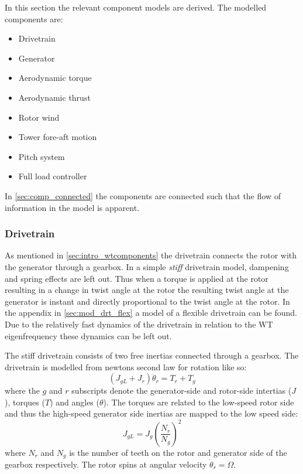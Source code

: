 \smallskip
\noindent In this section the relevant component models are derived. The modelled components are:
\begin{itemize}
	\item Drivetrain
	\item Generator
	\item Aerodynamic torque
	\item Aerodynamic thrust
	\item Rotor wind
	\item Tower fore-aft motion
	\item Pitch system
	\item Full load controller
\end{itemize}
In \cref{sec:comp_connected} the components are connected such that the flow of information in the model is apparent. 


\subsubsection{Drivetrain} \label{sec:comp_drv}
As mentioned in \cref{sec:intro_wtcomponents} the drivetrain connects the rotor with the generator through a gearbox. In a simple \textit{stiff} drivetrain model, dampening and spring effects are left out. Thus when a torque is applied at the rotor resulting in a change in twist angle at the rotor the resulting twist angle at the generator is instant and directly proportional to the twist angle at the rotor. In the appendix in \cref{sec:mod_drt_flex} a model of a flexible drivetrain can be found. Due to the relatively fast dynamics of the drivetrain in relation to the WT eigenfrequency these dynamics can be left out. 

The stiff drivetrain consists of two free inertias connected through a gearbox. The drivetrain is modelled from newtons second law for rotation like so:
\begin{equation}\label{eq:wtlin_comp_drivetrain}
	(J_{gL} + J_{r}) \ddot{\theta}_r = T_{r} + T_{g}
\end{equation}
where the $ g $ and $ r $ subscripts denote the generator-side and rotor-side intertias ($ J $), torques ($ T $) and angles ($ \theta $).
The torques are related to the low-speed rotor side and thus the high-speed generator side inertias are mapped to the low speed side:
\begin{equation} \label{eq:wtlin_comp_inertiamap}
	J_{gL} = J_{g} \left(\dfrac{N_r}{N_g}\right)^2
\end{equation}
where $ N_r $ and $ N_g $ is the number of teeth on the rotor and generator side of the gearbox respectively. The rotor spins at angular velocity $ \dot{\theta}_r = \Omega $.

